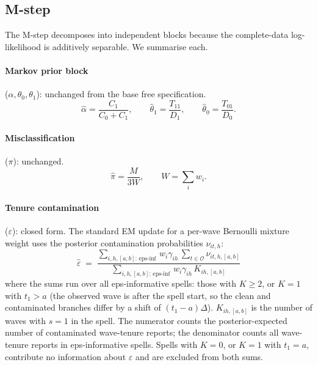 \documentclass[12pt]{article}
\begin{document}
\subsection{M-step}

The M-step decomposes into independent blocks because the complete-data
log-likelihood is additively separable. We summarise each.

\paragraph{Markov prior block} (\(\alpha,\theta_0,\theta_1\)): unchanged
from the base free specification.
\begin{equation}
\hat\alpha = \frac{C_1}{C_0+C_1}, \qquad
\hat\theta_1 = \frac{T_{11}}{D_1}, \qquad
\hat\theta_0 = \frac{T_{01}}{D_0}.
\end{equation}

\paragraph{Misclassification} (\(\pi\)): unchanged.
\begin{equation}
\hat\pi = \frac{M}{3W}, \qquad W = \sum_i w_i.
\end{equation}

\paragraph{Tenure contamination} (\(\varepsilon\)): closed form.
The standard EM update for a per-wave Bernoulli mixture weight uses the
posterior contamination probabilities \(\nu_{it,h}\):
\begin{equation}
\hat\varepsilon \;=\;
\frac{\sum_{i,h,[a,b]:\,\mathrm{eps\text{-}inf}}\, w_i \gamma_{ih}\,
      \sum_{t \in \mathcal{O}} \nu_{it,h,[a,b]}}
     {\sum_{i,h,[a,b]:\,\mathrm{eps\text{-}inf}}\, w_i \gamma_{ih}\, K_{ih,[a,b]}}
\label{eq:eps_mstep}
\end{equation}
where the sums run over all eps-informative spells: those with \(K \ge 2\),
or \(K = 1\) with \(t_1 > a\) (the observed wave is after the spell start,
so the clean and contaminated branches differ by a shift of
\((t_1-a)\Delta\)).
\(K_{ih,[a,b]}\) is the number of waves with \(s = 1\) in the spell.
The numerator counts the posterior-expected number of contaminated
wave-tenure reports; the denominator counts all wave-tenure reports in
eps-informative spells.
Spells with \(K = 0\), or \(K = 1\) with \(t_1 = a\), contribute no
information about \(\varepsilon\) and are excluded from both sums.
\end{document}
